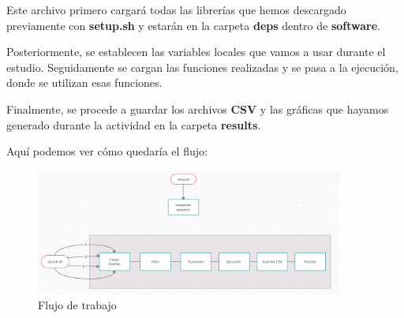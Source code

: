 Este archivo primero cargará todas las librerías que hemos descargado previamente con \textbf{setup.sh} y estarán en la carpeta \textbf{deps} dentro de \textbf{software}. 

Posteriormente, se establecen las variables locales que vamos a usar durante el estudio. Seguidamente se cargan las funciones realizadas y se pasa a la ejecución, donde se utilizan esas funciones. 

Finalmente, se procede a guardar los archivos \textbf{CSV} y las gráficas que hayamos generado durante la actividad en la carpeta \textbf{results}. 


Aquí podemos ver cómo quedaría el flujo: 

\begin{figure}[h!]
			\includegraphics[width=0.9\textwidth]{figures/flujo.jpg}
			\caption{Flujo de trabajo}
		\end{figure}

\newpage